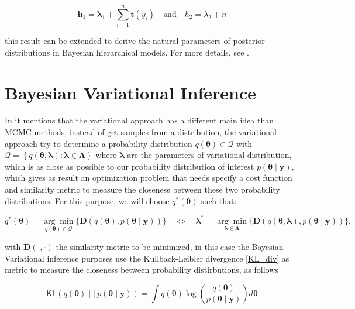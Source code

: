 \begin{equation}
    \bm{h}_{1}=\bm{\lambda}_1+\sum_{i=1}^{n}\bm{t}\left(y_i\right)\quad\text{and}\quad h_{2}=\lambda_2+n
\end{equation}

this result can be extended to derive the natural parameters of posterior distributions in Bayesian hierarchical models. For more details, see \cite{LAWRENCE}.

\section{Bayesian Variational Inference}

In \cite{ZETER} it mentions that the variational approach has a different main idea than MCMC methods, instead of get samples from a distribution, the variational approach try to determine a probability distribution $q(\bm{\theta})\in\bm{\mathcal{Q}}$ with $\bm{\mathcal{Q}}=\left\{q(\bm{\theta},\bm{\lambda}): \bm{\lambda}\in\bm{\Lambda}\right\}$ where $\bm{\lambda}$ are the parameters of variational distribution,  which is as close as possible to our probability distribution of interest $p(\bm{\theta}\mid\bm{y})$, which gives as result an optimization problem that needs specify a cost function and similarity metric to measure the closeness between these two probability distributions.
For this purpose, we will choose $q^{*}(\bm{\theta})$ such that:

\begin{equation}
\label{argmin_vi}
q^{*}(\bm{\theta})=
\underset{q(\bm{\theta}) \in \bm{\mathcal{Q}}}{\arg\min}
\lbrace\bm{D}\left(
q(\bm{\theta}),
p(\bm{\theta}\mid\bm{y})
\right)\rbrace
\quad
\Leftrightarrow
\quad
\bm{\lambda}^{*}
=
\underset{\bm{\lambda}\in\bm{\Lambda}}{\arg\min}
\lbrace\bm{D}\left(
q(\bm{\theta},\bm{\lambda}),
p(\bm{\theta}\mid\bm{y})
\right)\rbrace,
\end{equation}

with $\bm{D}(\cdot,\cdot)$ the similarity metric to be minimized, in this case the Bayesian Variational inference purposes use the Kullback-Leibler divergence \ref{KL_div} as metric to measure the closeness between probability distirbutions, as follows

\begin{equation}
    \label{VB}
    \mathsf{KL}\left(q(\bm{\theta})\mid\mid\ p(\bm{\theta}\mid\bm{y})\right)=\int q(\bm{\theta}) \log \left(\frac{q(\bm{\theta})}{p(\bm{\theta}\mid\bm{y})}\right)d\bm{\theta}
\end{equation}


